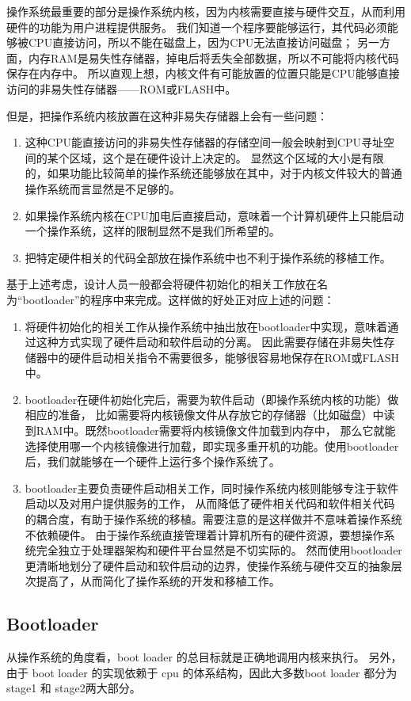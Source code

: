 操作系统最重要的部分是操作系统内核，因为内核需要直接与硬件交互，从而利用硬件的功能为用户进程提供服务。
我们知道一个程序要能够运行，其代码必须能够被CPU直接访问，所以不能在磁盘上，因为CPU无法直接访问磁盘；
另一方面，内存RAM是易失性存储器，掉电后将丢失全部数据，所以不可能将内核代码保存在内存中。
所以直观上想，内核文件有可能放置的位置只能是CPU能够直接访问的非易失性存储器——ROM或FLASH中。

但是，把操作系统内核放置在这种非易失存储器上会有一些问题：
\begin{enumerate}
  \item 这种CPU能直接访问的非易失性存储器的存储空间一般会映射到CPU寻址空间的某个区域，这个是在硬件设计上决定的。
显然这个区域的大小是有限的，如果功能比较简单的操作系统还能够放在其中，对于内核文件较大的普通操作系统而言显然是不足够的。
  \item 如果操作系统内核在CPU加电后直接启动，意味着一个计算机硬件上只能启动一个操作系统，这样的限制显然不是我们所希望的。
  \item 把特定硬件相关的代码全部放在操作系统中也不利于操作系统的移植工作。
\end{enumerate}

基于上述考虑，设计人员一般都会将硬件初始化的相关工作放在名为“bootloader”的程序中来完成。这样做的好处正对应上述的问题：
\begin{enumerate}
  \item 将硬件初始化的相关工作从操作系统中抽出放在bootloader中实现，意味着通过这种方式实现了硬件启动和软件启动的分离。
因此需要存储在非易失性存储器中的硬件启动相关指令不需要很多，能够很容易地保存在ROM或FLASH中。
  \item bootloader在硬件初始化完后，需要为软件启动（即操作系统内核的功能）做相应的准备，
比如需要将内核镜像文件从存放它的存储器（比如磁盘）中读到RAM中。既然bootloader需要将内核镜像文件加载到内存中，
那么它就能选择使用哪一个内核镜像进行加载，即实现多重开机的功能。使用bootloader后，我们就能够在一个硬件上运行多个操作系统了。
  \item bootloader主要负责硬件启动相关工作，同时操作系统内核则能够专注于软件启动以及对用户提供服务的工作，
从而降低了硬件相关代码和软件相关代码的耦合度，有助于操作系统的移植。需要注意的是这样做并不意味着操作系统不依赖硬件。
由于操作系统直接管理着计算机所有的硬件资源，要想操作系统完全独立于处理器架构和硬件平台显然是不切实际的。
然而使用bootloader更清晰地划分了硬件启动和软件启动的边界，使操作系统与硬件交互的抽象层次提高了，从而简化了操作系统的开发和移植工作。
\end{enumerate}

\subsection{Bootloader}
从操作系统的角度看，boot loader 的总目标就是正确地调用内核来执行。
另外，由于 boot loader 的实现依赖于 cpu 的体系结构，因此大多数boot loader 都分为 stage1 和 stage2两大部分。

